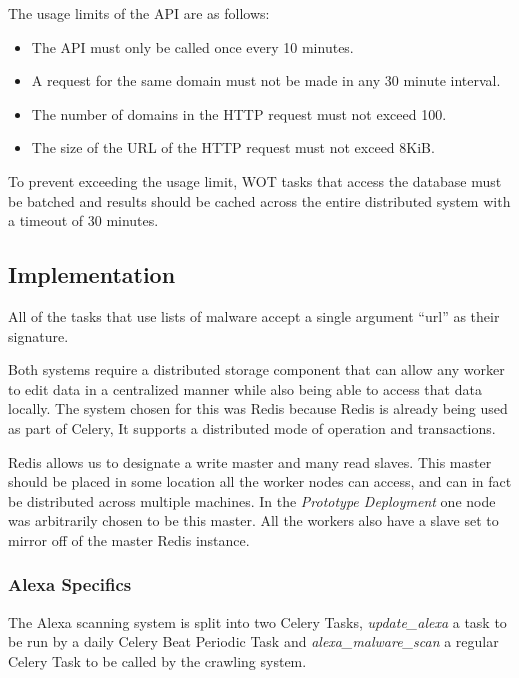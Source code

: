 The usage limits of the API are as follows\cite{wot-about}:

\begin{itemize}
    \item The API must only be called once every 10 minutes.
    \item A request for the same domain must not be made in any 30 minute interval.
    \item The number of domains in the HTTP request must not exceed 100.
    \item The size of the URL of the HTTP request must not exceed 8KiB.
\end{itemize}

To prevent exceeding the usage limit, WOT tasks that access the database must be batched and results should be cached across the entire distributed system with a timeout of 30 minutes.


\subsection{Implementation}
All of the tasks that use lists of malware accept a single argument ``url'' as their signature.

Both systems require a distributed storage component that can allow any worker to edit data in a centralized manner while also being able to access that data locally. The system chosen for this was Redis\cite{redis} because Redis is already being used as part of Celery, It supports a distributed mode of operation and transactions.

Redis allows us to designate a write master and many read slaves. This master should be placed in some location all the worker nodes can access, and can in fact be distributed across multiple machines.  In the \emph{Prototype Deployment} one node was arbitrarily chosen to be this master. All the workers also have a slave set to mirror off of the master Redis instance.

\subsubsection{Alexa Specifics}
The Alexa scanning system is split into two Celery Tasks, \emph{update_alexa} a task to be run by a daily Celery Beat Periodic Task and \emph{alexa_malware_scan} a regular Celery Task to be called by the crawling system.

